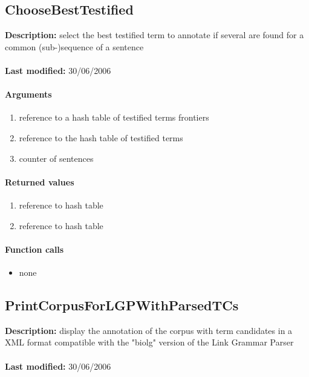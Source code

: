 \subsection{ChooseBestTestified}
\textbf{Description:} select the best testified term to annotate if several are found for a common (sub-)sequence of a sentence\\
\\\textbf{Last modified:} 30/06/2006

\paragraph{Arguments}
\begin{enumerate}
\item reference to a hash table of testified terms frontiers
\item reference to the hash table of testified terms
\item counter of sentences
\end{enumerate}

\paragraph{Returned values}
\begin{enumerate}
\item reference to hash table
\item reference to hash table
\end{enumerate}

\paragraph{Function calls}
\begin{itemize}
\item none
\end{itemize}

\subsection{PrintCorpusForLGPWithParsedTCs}
\textbf{Description:} display the annotation of the corpus with term candidates in a XML format compatible with the "biolg" version of the Link Grammar Parser\\
\\\textbf{Last modified:} 30/06/2006

